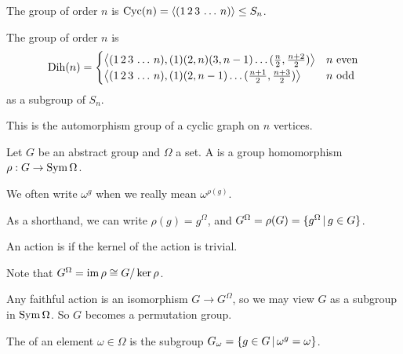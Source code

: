 \begin{definition}
  The  group of order $n$ is $\operatorname{Cyc}(n) =
  \left< (1\,2\,3\,\ldots\,n) \right> \le S_n$.
\end{definition}

\begin{definition}
  The  group of order $n$ is
  \[
	\operatorname{Dih}(n) =
	\begin{cases}
	  \left< (1\,2\,3\,\ldots\,n), (1) (2,n) (3,n-1) \ldots
	  (\frac{n}{2},\frac{n+2}{2}) \right> & \text{$n$ even} \\
	  \left<  (1\,2\,3\,\ldots\,n), (1) (2,n-1) \ldots
	  (\frac{n+1}{2},\frac{n+3}{2})  \right> & \text{$n$ odd}
	\end{cases}
  \]
  as a subgroup of $S_n$.
\end{definition}

\begin{remark}
  This is the automorphism group of a cyclic graph on $n$ vertices.
\end{remark}

\begin{definition}
  Let $G$ be an abstract group and $\Omega$ a set.
  A  is a group homomorphism $\rho: G \to \operatorname{Sym} \Omega$.
\end{definition}

\begin{remark}
  We often write $\omega^g$ when we really mean $\omega^{\rho(g)}$.
\end{remark}

\begin{remark}
  As a shorthand, we can write $\rho(g) = g^\Omega$, and $G^\Omega = \rho(G) =
  \{ g^\Omega \,|\, g \in G \}$.
\end{remark}

\begin{definition}
  An action is  if the kernel of the action is trivial.
\end{definition}

\begin{remark}
  Note that $G^\Omega = \operatorname{im} \rho \cong G / \operatorname{ker} \rho$.
\end{remark}

\begin{remark}
  Any faithful action is an isomorphism $G \to G^\Omega$, so we may view $G$ as
  a subgroup in $\operatorname{Sym} \Omega$.
  So $G$ becomes a permutation group.
\end{remark}

\begin{definition}
  The  of an element $\omega \in \Omega$ is the subgroup
  $G_\omega = \{ g \in G \,|\, \omega^g = \omega \}$.
\end{definition}

